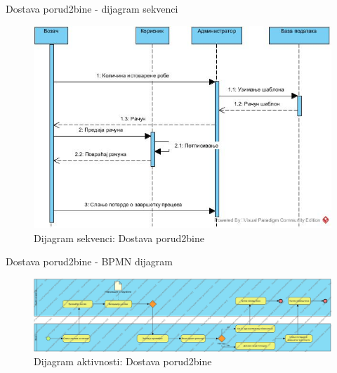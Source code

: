 \documentclass[11pt]{beamer}
\begin{document}
\begin{frame}{Dostava porud2bine - dijagram sekvenci}
\begin{figure}
    \centering
    \includegraphics[scale=0.4]{Slike/DFD/DS_transport.jpg}
    \caption{Dijagram sekvenci: Dostava porud2bine}
    \label{fig:dsdp}
\end{figure}
\end{frame}
\begin{frame}{Dostava porud2bine - BPMN dijagram}
\begin{figure}
    \centering
    \includegraphics[scale=0.19]{Slike/BPMN/SUdostavljanjePorudzbineBPMN.jpg}
    \caption{Dijagram aktivnosti: Dostava porud2bine}
    \label{fig:bmpndp}
\end{figure}
\end{frame}
\end{document}
